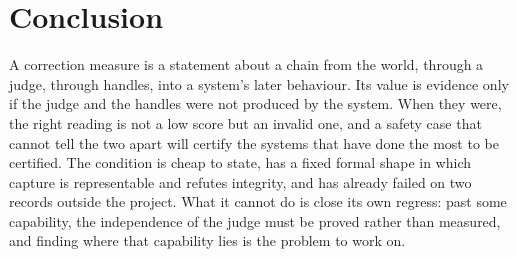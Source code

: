 \documentclass[11pt]{article}
\theoremstyle{remark}
\begin{document}
\section{Conclusion}

A correction measure is a statement about a chain from the world, through a judge, through handles, into a system's later behaviour. Its value is evidence only if the judge and the handles were not produced by the system. When they were, the right reading is not a low score but an invalid one, and a safety case that cannot tell the two apart will certify the systems that have done the most to be certified. The condition is cheap to state, has a fixed formal shape in which capture is representable and refutes integrity, and has already failed on two records outside the project. What it cannot do is close its own regress: past some capability, the independence of the judge must be proved rather than measured, and finding where that capability lies is the problem to work on.

\printbibliography
\end{document}

